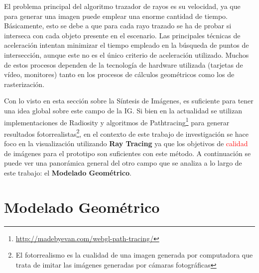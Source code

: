 

El problema principal del algoritmo trazador de rayos es su velocidad, ya que para generar una imagen puede emplear una enorme cantidad de tiempo. Básicamente, esto se debe a que para cada rayo trazado se ha de probar si interseca con cada objeto presente en el escenario. Las principales técnicas de aceleración intentan minimizar el tiempo empleado en la búsqueda de puntos de intersección, aunque este no es el único criterio de aceleración utilizado. Muchos de estos procesos dependen de la tecnología de hardware utilizada (tarjetas de vídeo, monitores) tanto en los procesos de cálculos geométricos como los de rasterización.


Con lo visto en esta sección sobre la Síntesis de Imágenes, es suficiente para tener una idea global sobre este campo de la IG. Si bien en la actualidad se utilizan implementaciones de Radiosity y algoritmos de Pathtracing\footnote{\url{http://madebyevan.com/webgl-path-tracing/}} para generar resultados fotorrealistas\footnote{El fotorrealismo es la cualidad de una imagen generada por computadora que trata de imitar las imágenes generadas por cámaras fotográficas}, en el contexto de este trabajo de investigación se hace foco en la visualización utilizando \textbf{Ray Tracing} ya que los objetivos de \textcolor{red}{calidad} de imágenes para el prototipo son suficientes con este método. A continuación se puede ver una panorámica general del otro campo que se analiza a lo largo de este trabajo: el \textbf{Modelado Geométrico}.


\clearpage
\section{Modelado Geométrico}

